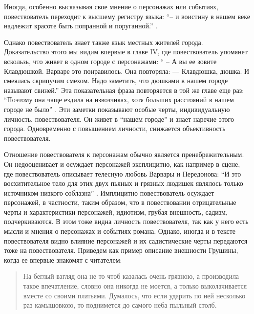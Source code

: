 \documentclass[12pt,a4paper]{article}
\begin{document}
Иногда, особенно высказывая свое мнение о персонажах или событиях, повествователь переходит к высшему регистру языка: \enquote{– и воистину в нашем веке надлежит красоте быть попранной и поруганной.} \parencite[51]{sologub2004}.

%
%

Однако повествователь знает также язык местных жителей города. Доказательство этого мы видим впервые в главе IV, где повествователь упомянет вскользь, что живет в одном городе с персонажами: \enquote{ – А вы ее зовите Клавдюшкой.
Варваре это понравилось. Она повторяла:
— Клавдюшка, дюшка.
И смеялась скрипучим смехом. Надо заметить, что дюшками в
нашем городе называют свиней.} \Parencite[33.]{sologub2004} Эта показательная фраза повторяется в той же главе еще раз: \enquote{Поэтому она чаще ездила на извозчиках,
хотя больших расстояний в нашем городе не было} \parencite[34]{sologub2004}. Эти заметки показывают особые черты, индивидуальную личность,  повествователя. Он живет в \enquote{нашем городе} и знает наречие этого города. Одновременно с повышением личности, снижается объективность повествователя.

Отношение повествователя к персонажам обычно является пренебрежительным. Он недооценивает и осуждает персонажей эксплицитно, как например в сцене, где повествователь описывает телесную любовь Варвары и Передонова:
\enquote{И это восхитительное тело для этих двух пьяных и грязных людишек являлось только источником низкого соблазна} \parencite[51]{sologub2004}.
Имплицитно повествователь осуждает персонажей, в частности, таким образом, что в повествовании отрицательные черты и характеристики персонажей, идиотизм, грубая внешность, садизм, подчеркиваются. В этом тоже видна личность повествователя, так как у него есть мысли и мнения о персонажах и событиях романа. Однако, иногда и в тексте повествователя видно влияние персонажей и их садистические черты передаются тоже на повествователя. Приведем как пример описание внешности Грушины, когда ее впервые знакомят с читателем:


\begin{quote}
На беглый взгляд она не то
чтоб казалась очень грязною, а производила такое впечатление, словно
она никогда не моется, а только выколачивается вместе со своими
платьями. Думалось, что если ударить по ней несколько раз камышовкою,
то поднимется до самого неба пыльный столб.

\parencite[33.]{sologub2004}
\end{quote}
\end{document}
